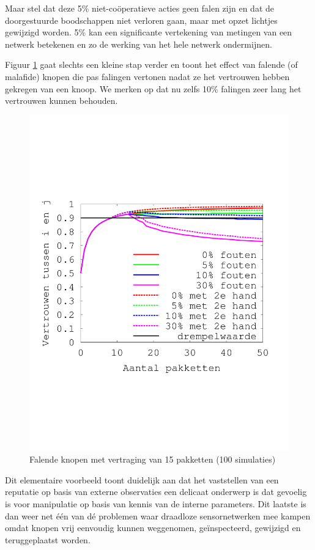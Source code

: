 Maar stel dat deze 5\% niet-co\"operatieve acties geen falen zijn en dat de
doorgestuurde boodschappen niet verloren gaan, maar met opzet lichtjes
gewijzigd worden. 5\% kan een significante vertekening van metingen van een
netwerk betekenen en zo de werking van het hele netwerk ondermijnen.

Figuur \ref{fig:reputation-malicious} gaat slechts een kleine stap verder en
toont het effect van falende (of malafide) knopen die pas falingen vertonen
nadat ze het vertrouwen hebben gekregen van een knoop. We merken op dat nu zelfs
10\% falingen zeer lang het vertrouwen kunnen behouden.

\begin{figure}[ht]
 \centering
 \includegraphics[width=.6\linewidth]{./resources/reputation-malicious.pdf}
 \caption{Falende knopen met vertraging van 15 pakketten (100 simulaties)}
 \label{fig:reputation-malicious}
\end{figure}

Dit elementaire voorbeeld toont duidelijk aan dat het vaststellen van een
reputatie op basis van externe observaties een delicaat onderwerp is dat
gevoelig is voor manipulatie op basis van kennis van de interne parameters. Dit
laatste is dan weer net \'e\'en van d\'e problemen waar draadloze
sensornetwerken mee kampen omdat knopen vrij eenvoudig kunnen weggenomen,
ge\"inspecteerd, gewijzigd en teruggeplaatst worden.
